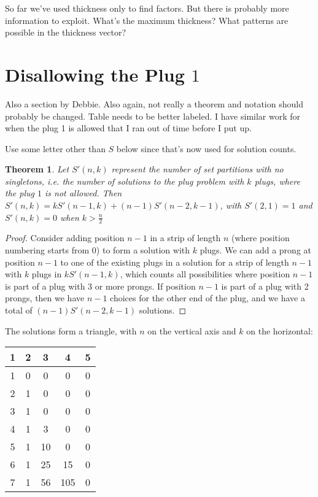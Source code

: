 \documentclass[10pt]{article}
\newtheorem{theorem}{Theorem}
\numberwithin{equation}{section}
\newenvironment{anote}
               {{\textcolor{blue}{Note:}}
                 \itshape
               }
               {}
\begin{document}
\begin{anote}
So far we've used thickness only to find factors. But there is
probably more information to exploit. What's the maximum thickness?
What patterns are possible in the thickness vector?
\end{anote}

\section {Disallowing the Plug $1$}

\begin{anote}
Also a section by Debbie.  Also again, not really a theorem and notation should probably be changed. Table needs to be better labeled.  I have similar work for when the plug 1 is allowed that I ran out of time before I put up. 
\end{anote}

\begin{anote}
Use some letter other than $S$ below since that's now used for solution counts.
\end{anote}
\begin{theorem}
Let $S'(n,k)$ represent the number of set partitions with no singletons, i.e. the number of solutions to the plug problem with $k$ plugs, where the plug $1$ is not allowed. Then $S'(n,k) = kS'(n-1,k) + (n-1)S'(n-2,k-1)$, with $S'(2,1)=1$ and $S'(n,k) =0$ when $k > \frac{n}{2}$
\end{theorem}

\begin{proof}
Consider adding position $n-1$ in a strip of length $n$ (where position numbering starts from $0$) to form a solution with $k$ plugs. We can add a prong at position $n-1$ to one of the existing plugs in a solution for a strip of length $n-1$ with $k$ plugs in $kS'(n-1,k)$, which counts all possibilities where position $n-1$ is part of a plug with 3 or more prongs. If position $n-1$ is part of a plug with 2 prongs, then we have $n-1$ choices for the other end of the plug, and we have a total of  $(n-1)S'(n-2,k-1)$ solutions. 
\end{proof}

The solutions form a triangle, with $n$ on the vertical axis and $k$ on the horizontal:

\begin{center}
\begin{tabular}{ |c|c|c|c|c| } 
 \hline
 1 & 2 & 3  & 4 & 5\\ 
 \hline
1 & 0 & 0  & 0 & 0\\ 
2 & 1 & 0  & 0 & 0\\ 
3 & 1 & 0  & 0 & 0\\ 
4 & 1 & 3  & 0 & 0\\ 
5 & 1 & 10  & 0 & 0\\ 
6 & 1 & 25  & 15 & 0\\ 
7 & 1 & 56  & 105 & 0\\ 

 \hline
\end{tabular}
\end{center}
\end{document}

